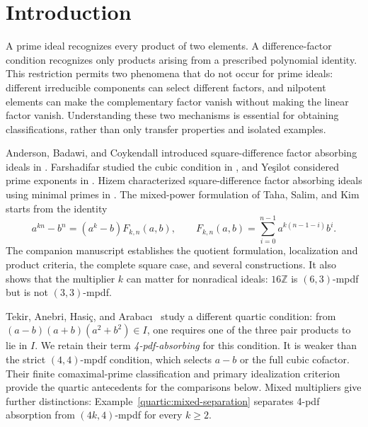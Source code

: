 \documentclass[11pt,a4paper]{amsart}
\theoremstyle{definition}
\theoremstyle{remark}
\numberwithin{equation}{section}
\begin{document}
\section{Introduction}

A prime ideal recognizes every product of two elements. A difference-factor
condition recognizes only products arising from a prescribed polynomial
identity. This restriction permits two phenomena that do not occur for
prime ideals: different irreducible components can select different factors,
and nilpotent elements can make the complementary factor vanish without
making the linear factor vanish. Understanding these two mechanisms is
essential for obtaining classifications, rather than only transfer
properties and isolated examples.

Anderson, Badawi, and Coykendall introduced square-difference factor
absorbing ideals in \cite{ABC}. Farshadifar studied the cubic condition in
\cite{Far}, and Ye\c{s}ilot considered prime exponents in \cite{Yes}.
Hizem characterized square-difference factor absorbing ideals using minimal
primes in \cite{Hizem}. The mixed-power formulation of Taha, Salim, and Kim
\cite{TS} starts from the identity
\[
 a^{kn}-b^n=(a^k-b)F_{k,n}(a,b),\qquad
 F_{k,n}(a,b)=\sum_{i=0}^{n-1}a^{k(n-1-i)}b^i.
\]
The companion manuscript establishes the quotient formulation, localization and
product criteria, the complete square case, and several constructions.
It also shows that the multiplier $k$ can matter for nonradical ideals:
$16\mathbb Z$ is $(6,3)$-mpdf but is not $(3,3)$-mpdf.

Tekir, Anebri, Hasi\c{c}, and Arabac{\i}~\cite{TAHA} study a different
quartic condition: from $(a-b)(a+b)(a^2+b^2)\in I$, one requires
one of the three pair products to lie in $I$. We retain their term
\emph{4-pdf-absorbing} for this condition. It is weaker than the
strict $(4,4)$-mpdf condition, which selects $a-b$ or the full cubic
cofactor. Their finite comaximal-prime classification and primary
idealization criterion provide the quartic antecedents for the
comparisons below. Mixed multipliers give further distinctions:
Example~\ref{quartic:mixed-separation} separates 4-pdf absorption
from $(4k,4)$-mpdf for every $k\ge2$.
\end{document}
